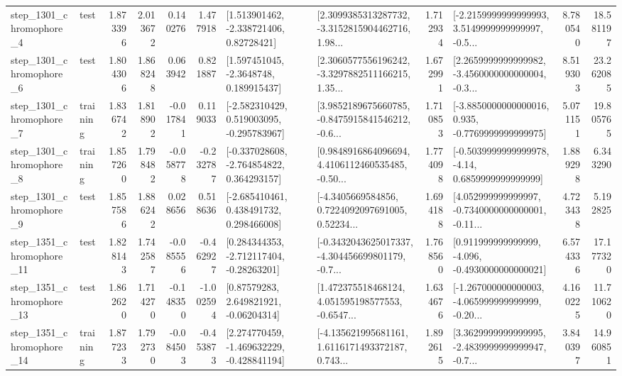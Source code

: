 \begin{tabular}{llrrrrllrlrr}
  step\_1301\_chromophore\_4 &      test &      1.873396 &    2.013672 &      0.140276 &  1.477918 &     [1.513901462, -2.338721406, 0.82728421] &  [2.3099385313287732, -3.3152815904462716, 1.98... &       1.712934 &  [-2.2159999999999993, 3.5149999999999997, -0.5... &            8.780540 &         18.581197 \\
  step\_1301\_chromophore\_6 &      test &      1.804306 &    1.868248 &      0.063942 &  0.821887 &      [1.597451045, -2.3648748, 0.189915437] &  [2.3060577556196242, -3.3297882511166215, 1.35... &       1.672991 &  [2.2659999999999982, -3.4560000000000004, -0.3... &            8.519303 &         23.262085 \\
  step\_1301\_chromophore\_7 &  training &      1.836742 &    1.818902 &     -0.017841 &  0.119033 &   [-2.582310429, 0.519003095, -0.295783967] &  [3.9852189675660785, -0.8475915841546212, -0.6... &       1.710853 &  [-3.8850000000000016, 0.935, -0.7769999999999975] &            5.071151 &         19.805765 \\
  step\_1301\_chromophore\_8 &  training &      1.857260 &    1.798482 &     -0.058778 & -0.232787 &   [-0.337028608, -2.764854822, 0.364293157] &  [0.9848916864096694, 4.4106112460535485, -0.50... &       1.774098 &   [-0.5039999999999978, -4.14, 0.6859999999999999] &            1.889298 &          6.343290 \\
  step\_1301\_chromophore\_9 &      test &      1.857586 &    1.886242 &      0.028656 &  0.518636 &    [-2.685410461, 0.438491732, 0.298466008] &  [-4.3405669584856, 0.7224092097691005, 0.52234... &       1.694188 &  [4.052999999999997, -0.7340000000000001, -0.11... &            4.723438 &          5.192825 \\
 step\_1351\_chromophore\_11 &      test &      1.828143 &    1.742587 &     -0.085556 & -0.462927 &    [0.284344353, -2.712117404, -0.28263201] &  [-0.3432043625017337, -4.304456699801179, -0.7... &       1.768560 &   [0.911999999999999, -4.096, -0.4930000000000021] &            6.574336 &         17.177320 \\
 step\_1351\_chromophore\_13 &      test &      1.862620 &    1.714270 &     -0.148350 & -1.002594 &      [0.87579283, 2.649821921, -0.06204314] &  [1.472375518468124, 4.051595198577553, -0.6547... &       1.634676 &  [-1.267000000000003, -4.065999999999999, -0.20... &            4.160225 &         11.710620 \\
 step\_1351\_chromophore\_14 &  training &      1.877233 &    1.792730 &     -0.084503 & -0.453873 &   [2.274770459, -1.469632229, -0.428841194] &  [-4.135621995681161, 1.6116171493372187, 0.743... &       1.892615 &  [3.3629999999999995, -2.4839999999999947, -0.7... &            3.840397 &         14.960851 \\

\end{tabular}
